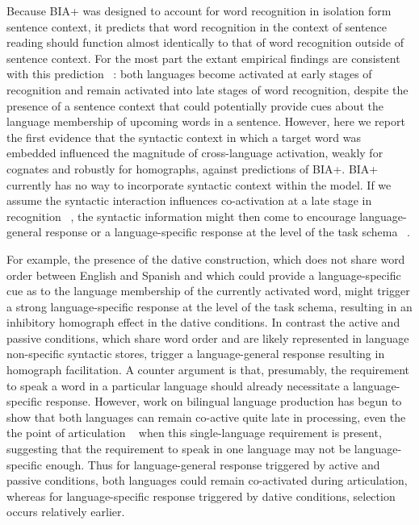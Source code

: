 Because BIA+ was designed to account for word recognition in isolation form sentence context, it predicts that word recognition in the context of sentence reading should function almost identically to that of word recognition outside of sentence context. For the most part the extant empirical findings are consistent with this prediction ~\citep[e.g.,][]{VanAssche2010}: both languages become activated at early stages of recognition and remain activated into late stages of word recognition, despite the presence of a sentence context that could potentially provide cues about the language membership of upcoming words in a sentence. However, here we report the first evidence that the syntactic context in which a target word was embedded influenced the magnitude of cross-language activation, weakly for cognates and robustly for homographs, against predictions of BIA+. BIA+ currently has no way to incorporate syntactic context within the model. If we assume the syntactic interaction influences co-activation at a late stage in recognition ~\citep[consistent with other findings of interactions between sentence context and cross-language activation e.g.,][]{Libben2009}, the syntactic information might then come to encourage language-general response or a language-specific response at the level of the task schema ~\citep[see e.g.,][]{Dijkstra1998}.

For example, the presence of the dative construction, which does not share word order between English and Spanish and which could provide a language-specific cue as to the language membership of the currently activated word, might trigger a strong language-specific response at the level of the task schema, resulting in an inhibitory homograph effect in the dative conditions. In contrast the active and passive conditions, which share word order and are likely represented in language non-specific syntactic stores, trigger a language-general response resulting in homograph facilitation. A counter argument is that, presumably, the requirement to speak a word in a particular language should already necessitate a language-specific response. However, work on bilingual language production has begun to show that both languages can remain co-active quite late in processing, even the the point of articulation ~\citep{Jacobs2005} when this single-language requirement is present, suggesting that the requirement to speak in one language may not be language-specific enough. Thus for language-general response triggered by active and passive conditions, both languages could remain co-activated during articulation, whereas for language-specific response triggered by dative conditions, selection occurs  relatively earlier. 

